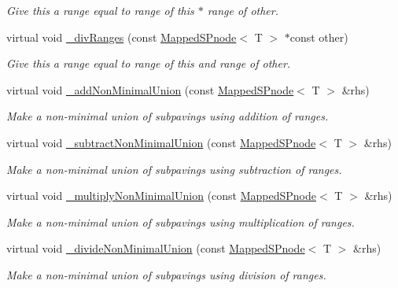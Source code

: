 \begin{DoxyCompactItemize}
\begin{DoxyCompactList}\small\item\em \-Give this a range equal to range of this $\ast$ range of other. \end{DoxyCompactList}\item 
virtual void \hyperlink{classsubpavings_1_1MappedSPnode_a7fb50e0bf02d5d5d5a3753a1ff381ae7}{\-\_\-div\-Ranges} (const \hyperlink{classsubpavings_1_1MappedSPnode}{\-Mapped\-S\-Pnode}$<$ \-T $>$ $\ast$const other)
\begin{DoxyCompactList}\small\item\em \-Give this a range equal to range of this and range of other. \end{DoxyCompactList}\item 
virtual void \hyperlink{classsubpavings_1_1MappedSPnode_a30fc46b2dd6b0ca4ad703f323a050c7b}{\-\_\-add\-Non\-Minimal\-Union} (const \hyperlink{classsubpavings_1_1MappedSPnode}{\-Mapped\-S\-Pnode}$<$ \-T $>$ \&rhs)
\begin{DoxyCompactList}\small\item\em \-Make a non-\/minimal union of subpavings using addition of ranges. \end{DoxyCompactList}\item 
virtual void \hyperlink{classsubpavings_1_1MappedSPnode_a9880ddfe3c75fe8e7594ee6222040d79}{\-\_\-subtract\-Non\-Minimal\-Union} (const \hyperlink{classsubpavings_1_1MappedSPnode}{\-Mapped\-S\-Pnode}$<$ \-T $>$ \&rhs)
\begin{DoxyCompactList}\small\item\em \-Make a non-\/minimal union of subpavings using subtraction of ranges. \end{DoxyCompactList}\item 
virtual void \hyperlink{classsubpavings_1_1MappedSPnode_a9f6b48701e09b97fbd169db927df0758}{\-\_\-multiply\-Non\-Minimal\-Union} (const \hyperlink{classsubpavings_1_1MappedSPnode}{\-Mapped\-S\-Pnode}$<$ \-T $>$ \&rhs)
\begin{DoxyCompactList}\small\item\em \-Make a non-\/minimal union of subpavings using multiplication of ranges. \end{DoxyCompactList}\item 
virtual void \hyperlink{classsubpavings_1_1MappedSPnode_a29dac80a6e0ecce51b22816ef78a298d}{\-\_\-divide\-Non\-Minimal\-Union} (const \hyperlink{classsubpavings_1_1MappedSPnode}{\-Mapped\-S\-Pnode}$<$ \-T $>$ \&rhs)
\begin{DoxyCompactList}\small\item\em \-Make a non-\/minimal union of subpavings using division of ranges. \end{DoxyCompactList}\item 

\end{DoxyCompactItemize}

